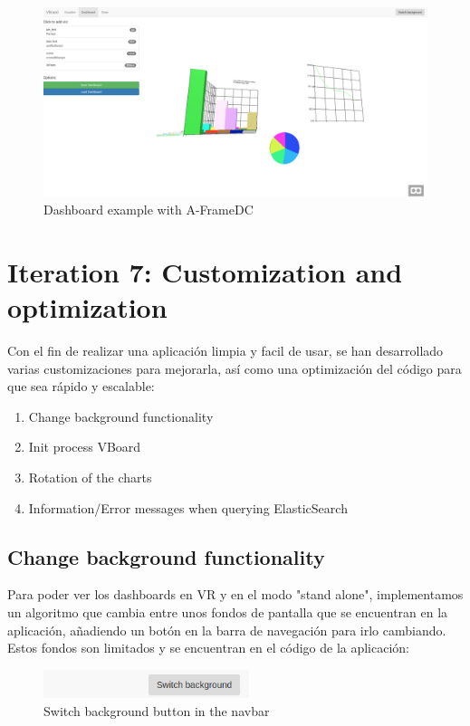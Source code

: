 \documentclass[a4paper, 12pt]{book}
\begin{document}
\begin{figure}[H]
  \centering
  \includegraphics[width=16cm, keepaspectratio]{img/development/dashtestaframedc}
  \caption{Dashboard example with A-FrameDC}
  \label{fig:examplestandalone}
\end{figure}



\section{Iteration 7: Customization and optimization}

Con el fin de realizar una aplicación limpia y facil de usar, se han desarrollado varias customizaciones para mejorarla, así como una optimización del código para que sea rápido y escalable:

\begin{enumerate}
    \item Change background functionality
    \item Init process VBoard
    \item Rotation of the charts
    \item Information/Error messages when querying ElasticSearch
\end{enumerate}

\subsection{Change background functionality}

Para poder ver los dashboards en VR y en el modo "stand alone", implementamos un algoritmo que cambia entre unos fondos de pantalla que se encuentran en la aplicación, añadiendo un botón en la barra de navegación para irlo cambiando. Estos fondos son limitados y se encuentran en el código de la aplicación:

\begin{figure}[H]
  \centering
  \includegraphics[width=6cm, keepaspectratio]{img/development/switchbackgroundbutton}
  \caption{Switch background button in the navbar}
  \label{fig:examplestandalone}
\end{figure}
\end{document}
